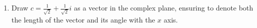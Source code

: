 \documentclass{article}
\begin{document}
\begin{enumerate}
\begin{enumerate}
          \item %
                Draw $c=\frac{1}{\sqrt{2}}+\frac{1}{\sqrt{2}}i$ as a vector in the complex plane, ensuring to denote both the length of the vector and its angle with the $x$ axis.

\end{enumerate}
\end{enumerate}
\end{document}
